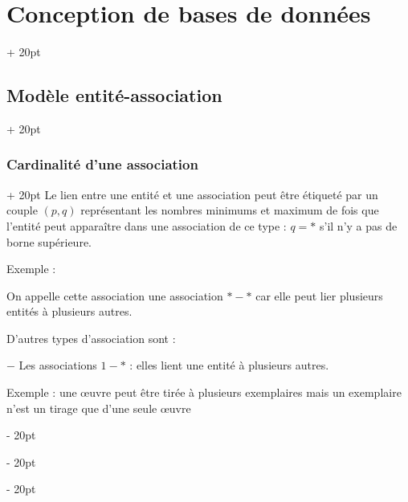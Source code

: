 \documentclass[a4paper, 12pt, twoside]{article}
\newcommand{\ind}[1][20pt]{\advance\leftskip + #1}
\newcommand{\deind}[1][20pt]{\advance\leftskip - #1}
\newenvironment{indt}[2][20pt]{#2 \par \ind[#1]}{\par \deind} %
\begin{document}
\begin{indt}{\section{Conception de bases de données}}
\begin{indt}{\subsection{Modèle entité-association}}
            \vspace{12pt}
            
            \begin{indt}{\subsubsection{Cardinalité d'une association}}
                Le lien entre une entité et une association peut être étiqueté par un couple $(p, q)$ représentant les nombres minimums et maximum de fois que l'entité peut apparaître dans une association de ce type : $q = *$  s'il n'y a pas de borne supérieure.

                Exemple :

                \begin{center}
                \end{center}

                On appelle cette association une association $*-*$ car elle peut lier plusieurs entités à plusieurs autres.

                D'autres types d'association sont :

                $-$ Les associations $1-*$ : elles lient une entité à plusieurs autres.

                Exemple : une \oe uvre peut être tirée à plusieurs exemplaires mais un exemplaire n'est un tirage que d'une seule \oe uvre

                \begin{center}
                \end{center}


\end{indt}
\end{indt}
\end{indt}
\end{document}
